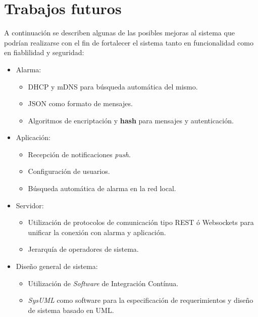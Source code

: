 \newpage

\section{Trabajos futuros}

A continuación se describen algunas de las posibles mejoras al sistema que podrían realizarse con el fin de fortalecer el sistema tanto en funcionalidad como en fiablilidad y seguridad:

\begin{itemize}
\item Alarma:
	\begin{itemize}
	\item DHCP y mDNS para búsqueda automática del mismo.
	\item JSON como formato de mensajes.
	\item Algoritmos de encriptación y \textbf{hash} para mensajes y autenticación.
	\end{itemize}
\item Aplicación:
	\begin{itemize}
	\item Recepción de notificaciones \textit{push}.
	\item Configuración de usuarios.
	\item Búsqueda automática de alarma en la red local.
	\end{itemize}
\item Servidor:
	\begin{itemize}
	\item Utilización de protocolos de comunicación tipo REST ó Websockets para unificar la conexión con alarma y aplicación.
	\item Jerarquía de operadores de sistema.
	\end{itemize}
\item Diseño general de sistema:
	\begin{itemize}
	\item Utilización de \textit{Software} de Integración Contínua.
	\item \textit{SysUML} como software para la especificación de requerimientos y diseño de sistema basado en UML.
	\end{itemize}
\end{itemize}

